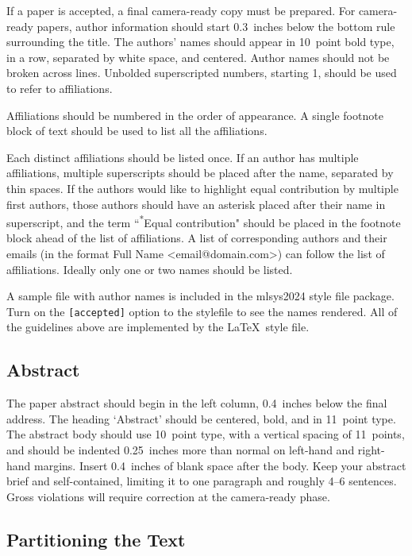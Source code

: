 \documentclass{article}
\begin{document}
If a paper is accepted, a final camera-ready copy must be prepared.
%
For camera-ready papers, author information should start 0.3~inches below the
bottom rule surrounding the title. The authors' names should appear in 10~point
bold type, in a row, separated by white space, and centered. Author names should
not be broken across lines. Unbolded superscripted numbers, starting 1, should
be used to refer to affiliations.

Affiliations should be numbered in the order of appearance. A single footnote
block of text should be used to list all the affiliations.

Each distinct affiliations should be listed once. If an author has multiple
affiliations, multiple superscripts should be placed after the name, separated
by thin spaces. If the authors would like to highlight equal contribution by
multiple first authors, those authors should have an asterisk placed after their
name in superscript, and the term ``\textsuperscript{*}Equal contribution"
should be placed in the footnote block ahead of the list of affiliations. A
list of corresponding authors and their emails (in the format Full Name
\textless{}email@domain.com\textgreater{}) can follow the list of affiliations.
Ideally only one or two names should be listed.

A sample file with author names is included in the mlsys2024 style file
package. Turn on the \texttt{[accepted]} option to the stylefile to
see the names rendered. All of the guidelines above are implemented
by the \LaTeX\ style file.

\subsection{Abstract}

The paper abstract should begin in the left column, 0.4~inches below the final
address. The heading `Abstract' should be centered, bold, and in 11~point type.
The abstract body should use 10~point type, with a vertical spacing of
11~points, and should be indented 0.25~inches more than normal on left-hand and
right-hand margins. Insert 0.4~inches of blank space after the body. Keep your
abstract brief and self-contained, limiting it to one paragraph and roughly 4--6
sentences. Gross violations will require correction at the camera-ready phase.

\subsection{Partitioning the Text}
\end{document}
